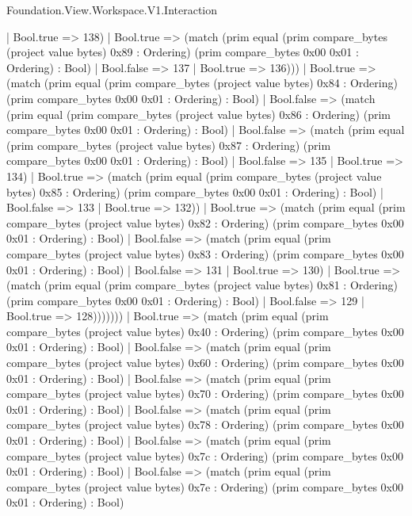 \begin{lexlean}{Foundation.View.Workspace.V1.Interaction}
\begin{semanticmodule}
{                    | Bool.true => 138)
                  | Bool.true => (match (prim equal (prim compare_bytes (project value bytes) 0x89 : Ordering) (prim compare_bytes 0x00 0x01 : Ordering) : Bool)
                    | Bool.false => 137
                    | Bool.true => 136)))
              | Bool.true => (match (prim equal (prim compare_bytes (project value bytes) 0x84 : Ordering) (prim compare_bytes 0x00 0x01 : Ordering) : Bool)
                | Bool.false => (match (prim equal (prim compare_bytes (project value bytes) 0x86 : Ordering) (prim compare_bytes 0x00 0x01 : Ordering) : Bool)
                  | Bool.false => (match (prim equal (prim compare_bytes (project value bytes) 0x87 : Ordering) (prim compare_bytes 0x00 0x01 : Ordering) : Bool)
                    | Bool.false => 135
                    | Bool.true => 134)
                  | Bool.true => (match (prim equal (prim compare_bytes (project value bytes) 0x85 : Ordering) (prim compare_bytes 0x00 0x01 : Ordering) : Bool)
                    | Bool.false => 133
                    | Bool.true => 132))
                | Bool.true => (match (prim equal (prim compare_bytes (project value bytes) 0x82 : Ordering) (prim compare_bytes 0x00 0x01 : Ordering) : Bool)
                  | Bool.false => (match (prim equal (prim compare_bytes (project value bytes) 0x83 : Ordering) (prim compare_bytes 0x00 0x01 : Ordering) : Bool)
                    | Bool.false => 131
                    | Bool.true => 130)
                  | Bool.true => (match (prim equal (prim compare_bytes (project value bytes) 0x81 : Ordering) (prim compare_bytes 0x00 0x01 : Ordering) : Bool)
                    | Bool.false => 129
                    | Bool.true => 128)))))))
      | Bool.true => (match (prim equal (prim compare_bytes (project value bytes) 0x40 : Ordering) (prim compare_bytes 0x00 0x01 : Ordering) : Bool)
        | Bool.false => (match (prim equal (prim compare_bytes (project value bytes) 0x60 : Ordering) (prim compare_bytes 0x00 0x01 : Ordering) : Bool)
          | Bool.false => (match (prim equal (prim compare_bytes (project value bytes) 0x70 : Ordering) (prim compare_bytes 0x00 0x01 : Ordering) : Bool)
            | Bool.false => (match (prim equal (prim compare_bytes (project value bytes) 0x78 : Ordering) (prim compare_bytes 0x00 0x01 : Ordering) : Bool)
              | Bool.false => (match (prim equal (prim compare_bytes (project value bytes) 0x7c : Ordering) (prim compare_bytes 0x00 0x01 : Ordering) : Bool)
                | Bool.false => (match (prim equal (prim compare_bytes (project value bytes) 0x7e : Ordering) (prim compare_bytes 0x00 0x01 : Ordering) : Bool)
}
\end{semanticmodule}
\end{lexlean}
